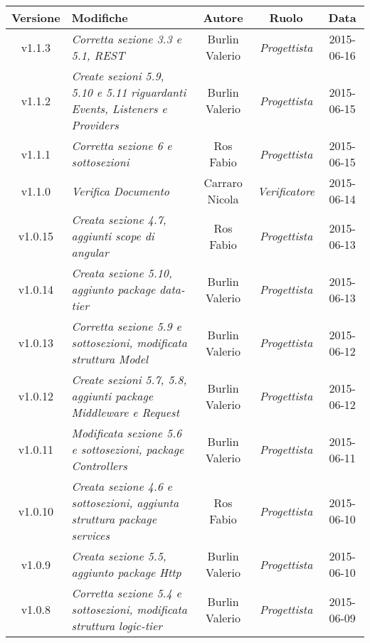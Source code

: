 \newpage

\begin{table}[h]
	\centering
	\begin{tabular}{|c|p{}|c|c|c|}
	\toprule
		\textbf{Versione} & \textbf{Modifiche} & \textbf{Autore} & \textbf{Ruolo} & \textbf{Data} \\
	\midrule
	\midrule
		v1.1.3 & \textit{Corretta sezione 3.3 e 5.1, REST} & Burlin Valerio & \textit{Progettista} & 2015-06-16\\
	\midrule
		v1.1.2 & \textit{Create sezioni 5.9, 5.10 e 5.11 riguardanti Events, Listeners e Providers} & Burlin Valerio & \textit{Progettista} & 2015-06-15\\
	\midrule
		v1.1.1 & \textit{Corretta sezione 6 e sottosezioni} & Ros Fabio & \textit{Progettista} & 2015-06-15\\
	\midrule
		v1.1.0 & \textit{Verifica Documento} & Carraro Nicola & \textit{Verificatore} & 2015-06-14\\
	\midrule
		v1.0.15 & \textit{Creata sezione 4.7, aggiunti scope di angular} & Ros Fabio & \textit{Progettista} & 2015-06-13\\
	\midrule
		v1.0.14 & \textit{Creata sezione 5.10, aggiunto package data-tier} & Burlin Valerio & \textit{Progettista} & 2015-06-13\\
	\midrule
		v1.0.13 & \textit{Corretta sezione 5.9 e sottosezioni, modificata struttura Model} & Burlin Valerio & \textit{Progettista} & 2015-06-12\\
	\midrule
		v1.0.12 & \textit{Create sezioni 5.7, 5.8, aggiunti package Middleware e Request} & Burlin Valerio & \textit{Progettista} & 2015-06-12\\
	\midrule
		v1.0.11 & \textit{Modificata sezione 5.6 e sottosezioni, package Controllers} & Burlin Valerio & \textit{Progettista} & 2015-06-11\\
	\midrule
		v1.0.10 & \textit{Creata sezione 4.6 e sottosezioni, aggiunta struttura package services} & Ros Fabio & \textit{Progettista} & 2015-06-10\\
	\midrule
		v1.0.9 & \textit{Creata sezione 5.5, aggiunto package Http} & Burlin Valerio & \textit{Progettista} & 2015-06-10\\
	\midrule
		v1.0.8 & \textit{Corretta sezione 5.4 e sottosezioni, modificata struttura logic-tier} & Burlin Valerio & \textit{Progettista} & 2015-06-09\\
	\bottomrule

\end{tabular}
\end{table}

